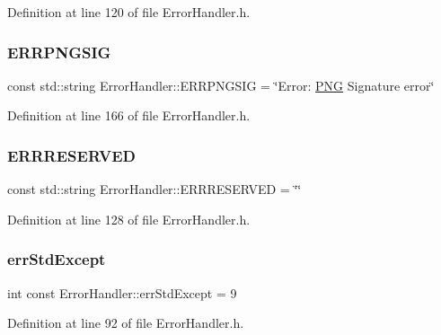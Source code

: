 Definition at line 120 of file Error\+Handler.\+h.

\mbox{\label{classErrorHandler_ad7f59edda1a1c28958eced1bc8bdeab7}} 
\subsubsection{\texorpdfstring{ERRPNGSIG}{ERRPNGSIG}}
{\footnotesize\ttfamily const std\+::string Error\+Handler\+::\+E\+R\+R\+P\+N\+G\+S\+IG = \char`\"{}Error\+: \mbox{\hyperlink{constants_8h_afac9cfa577b92c66f46f7603f2f9fc14}{P\+NG}} Signature error\char`\"{}\hspace{0.3cm}{\ttfamily [static]}}



Definition at line 166 of file Error\+Handler.\+h.

\mbox{\label{classErrorHandler_a737a712190c5e9dcbd11230bd3c2eaca}} 
\subsubsection{\texorpdfstring{ERRRESERVED}{ERRRESERVED}}
{\footnotesize\ttfamily const std\+::string Error\+Handler\+::\+E\+R\+R\+R\+E\+S\+E\+R\+V\+ED = \char`\"{}\char`\"{}\hspace{0.3cm}{\ttfamily [static]}}



Definition at line 128 of file Error\+Handler.\+h.

\mbox{\label{classErrorHandler_a6615c791920f871f02b017d415acf991}} 
\subsubsection{\texorpdfstring{errStdExcept}{errStdExcept}}
{\footnotesize\ttfamily int const Error\+Handler\+::err\+Std\+Except = 9\hspace{0.3cm}{\ttfamily [static]}}



Definition at line 92 of file Error\+Handler.\+h.

